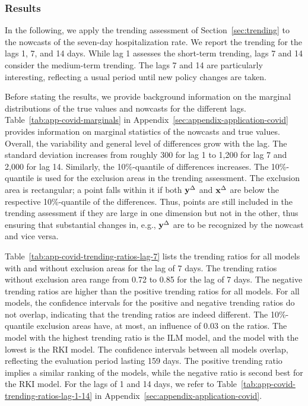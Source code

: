 \subsubsection*{Results}

In the following, we apply the trending assessment of Section~\ref{sec:trending} to the nowcasts of the seven-day hospitalization rate.
We report the trending for the lags 1, 7, and 14 days.
While lag 1 assesses the short-term trending, lags 7 and 14 consider the medium-term trending.
The lags 7 and 14 are particularly interesting, reflecting a usual period until new policy changes are taken.

Before stating the results, we provide background information on the marginal distributions of the true values and nowcasts for the different lags.
Table~\ref{tab:app-covid-marginals} in Appendix~\ref{sec:appendix-application-covid} provides information on marginal statistics of the nowcasts and true values.
Overall, the variability and general level of differences grow with the lag.
The standard deviation increases from roughly 300 for lag 1 to 1,200 for lag 7 and 2,000 for lag 14.
Similarly, the 10\%-quantile of differences increases.
The 10\%-quantile is used for the exclusion areas in the trending assessment.
The exclusion area is rectangular; a point falls within it if both $\mathbf{y}^{\Delta}$ and $\mathbf{x}^{\Delta}$ are below the respective 10\%-quantile of the differences.
Thus, points are still included in the trending assessment if they are large in one dimension but not in the other, thus ensuring that substantial changes in, e.g., $\mathbf{y}^{\Delta}$ are to be recognized by the nowcast and vice versa.

Table~\ref{tab:app-covid-trending-ratios-lag-7} lists the trending ratios for all models with and without exclusion areas for the lag of 7 days.
The trending ratios without exclusion area range from 0.72 to 0.85 for the lag of 7 days.
The negative trending ratios are higher than the positive trending ratios for all models.
For all models, the confidence intervals for the positive and negative trending ratios do not overlap, indicating that the trending ratios are indeed different.
The 10\%-quantile exclusion areas have, at most, an influence of 0.03 on the ratios.
The model with the highest trending ratio is the ILM model, and the model with the lowest is the RKI model.
The confidence intervals between all models overlap, reflecting the evaluation period lasting 159 days.
The positive trending ratio implies a similar ranking of the models, while the negative ratio is second best for the RKI model.
For the lags of 1 and 14 days, we refer to Table~\ref{tab:app-covid-trending-ratios-lag-1-14} in Appendix~\ref{sec:appendix-application-covid}.

